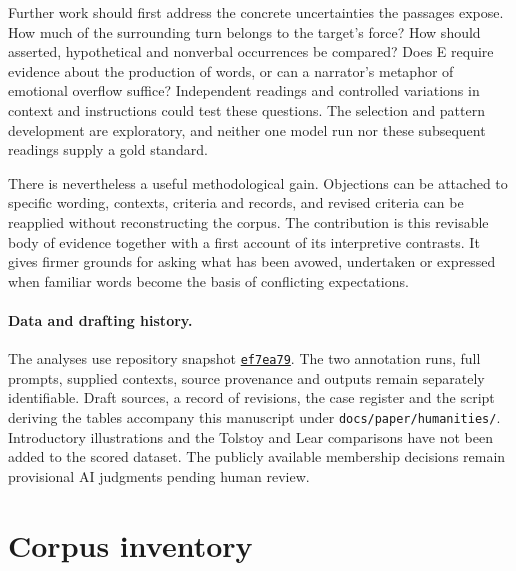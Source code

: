 \documentclass[11pt,a4paper]{article}
\newif\ifincludesupplement
\begin{document}
Further work should first address the concrete uncertainties the passages expose. How much of the surrounding turn belongs to the target's force? How should asserted, hypothetical and nonverbal occurrences be compared? Does E require evidence about the production of words, or can a narrator's metaphor of emotional overflow suffice? Independent readings and controlled variations in context and instructions could test these questions. The selection and pattern development are exploratory, and neither one model run nor these subsequent readings supply a gold standard.

There is nevertheless a useful methodological gain. Objections can be attached to specific wording, contexts, criteria and records, and revised criteria can be reapplied without reconstructing the corpus. The contribution is this revisable body of evidence together with a first account of its interpretive contrasts. It gives firmer grounds for asking what has been avowed, undertaken or expressed when familiar words become the basis of conflicting expectations.

\paragraph{Data and drafting history.}
The analyses use repository snapshot \href{https://github.com/mannyrayner/let_me_count_the_ways/tree/ef7ea7933d8aa02b176d8fbddc496e55a41a7144}{\texttt{ef7ea79}}. The two annotation runs, full prompts, supplied contexts, source provenance and outputs remain separately identifiable. Draft sources, a record of revisions, the case register and the script deriving the tables accompany this manuscript under \texttt{docs/paper/humanities/}. Introductory illustrations and the Tolstoy and Lear comparisons have not been added to the scored dataset. The publicly available membership decisions remain provisional AI judgments pending human review.




\clearpage
\appendix
\section{Corpus inventory}
\label{app:corpus}


\ifincludesupplement
\clearpage

\fi
\end{document}
